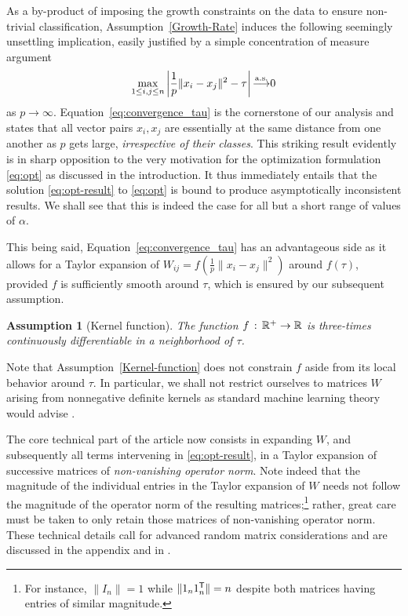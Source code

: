 \documentclass[twoside,11pt]{article}
\newcounter{cassumption}
\newtheorem{assumption}[cassumption]{Assumption}
\def\trans{{\sf T}}
\def\asto{ {\overset{\rm a.s.}{\longrightarrow}} }
\begin{document}
As a by-product of imposing the growth constraints on the data to ensure non-trivial classification, Assumption~\ref{Growth-Rate} induces the following seemingly unsettling implication, easily justified by a simple concentration of measure argument
\begin{align}
	\label{eq:convergence_tau}
	\max_{1\leq i,j\leq n} \left|\frac1p\|x_{i}-x_{j}\|^{2} - \tau\right| \asto 0
\end{align}
as $p\to\infty$. Equation~\eqref{eq:convergence_tau} is the cornerstone of our analysis and states that all vector pairs $x_i,x_j$ are essentially at the same distance from one another as $p$ gets large, \textit{irrespective of their classes}. This striking result evidently is in sharp opposition to the very motivation for the optimization formulation \eqref{eq:opt} as discussed in the introduction. It thus immediately entails that the solution \eqref{eq:opt-result} to \eqref{eq:opt} is bound to produce asymptotically inconsistent results. We shall see that this is indeed the case for all but a short range of values of $\alpha$.

This being said, Equation~\eqref{eq:convergence_tau} has an advantageous side as it allows for a Taylor expansion of $W_{ij}=f(\frac1p\|x_{i}-x_{j}\|^{2})$ around $f(\tau)$, provided $f$ is sufficiently smooth around $\tau$, which is ensured by our subsequent assumption.
\begin{assumption}[\label{Kernel-function}Kernel function]
The function $f\thinspace:\thinspace\mathbb{R}^{+}\rightarrow\mathbb{R}$ is three-times continuously differentiable in a neighborhood of $\tau$.
\end{assumption}
Note that Assumption~\ref{Kernel-function} does not constrain $f$ aside from its local behavior around $\tau$. In particular, we shall not restrict ourselves to matrices $W$ arising from nonnegative definite kernels as standard machine learning theory would advise \citep{scholkopf2002learning}.

The core technical part of the article now consists in expanding $W$, and subsequently all terms intervening in \eqref{eq:opt-result}, in a Taylor expansion of successive matrices of \textit{non-vanishing operator norm}. Note indeed that the magnitude of the individual entries in the Taylor expansion of $W$ needs not follow the magnitude of the operator norm of the resulting matrices;\footnote{For instance, $\|I_n\|=1$ while $\|1_n1_n^\trans\|=n$ despite both matrices having entries of similar magnitude.} rather, great care must be taken to only retain those matrices of non-vanishing operator norm. These technical details call for advanced random matrix considerations and are discussed in the appendix and in \citet{couillet2015kernel}.
\end{document}
